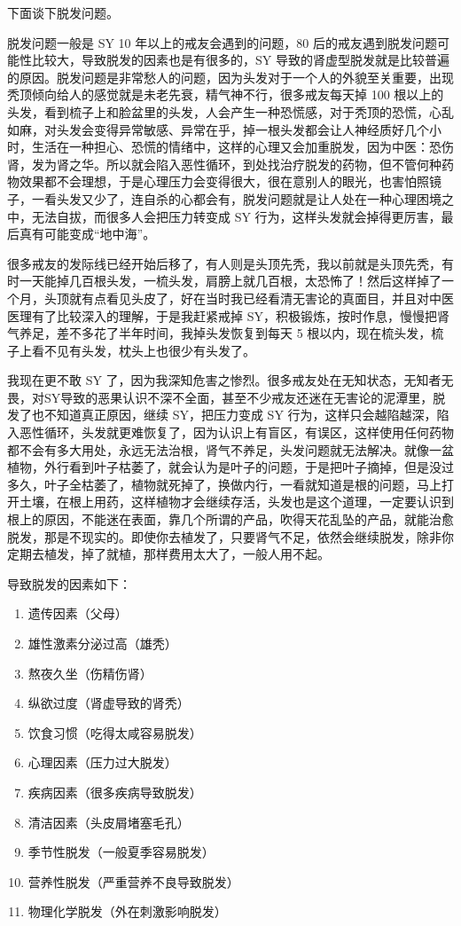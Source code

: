 \documentclass[fontset=founder]{ctexart}
\begin{document}
下面谈下脱发问题。

脱发问题一般是 SY 10 年以上的戒友会遇到的问题，80 后的戒友遇到脱发问题可能性比较大，导致脱发的因素也是有很多的，SY 导致的肾虚型脱发就是比较普遍的原因。脱发问题是非常愁人的问题，因为头发对于一个人的外貌至关重要，出现秃顶倾向给人的感觉就是未老先衰，精气神不行，很多戒友每天掉 100 根以上的头发，看到梳子上和脸盆里的头发，人会产生一种恐慌感，对于秃顶的恐慌，心乱如麻，对头发会变得异常敏感、异常在乎，掉一根头发都会让人神经质好几个小时，生活在一种担心、恐慌的情绪中，这样的心理又会加重脱发，因为中医：恐伤肾，发为肾之华。所以就会陷入恶性循环，到处找治疗脱发的药物，但不管何种药物效果都不会理想，于是心理压力会变得很大，很在意别人的眼光，也害怕照镜子，一看头发又少了，连自杀的心都会有，脱发问题就是让人处在一种心理困境之中，无法自拔，而很多人会把压力转变成 SY 行为，这样头发就会掉得更厉害，最后真有可能变成“地中海”。

很多戒友的发际线已经开始后移了，有人则是头顶先秃，我以前就是头顶先秃，有时一天能掉几百根头发，一梳头发，肩膀上就几百根，太恐怖了！然后这样掉了一个月，头顶就有点看见头皮了，好在当时我已经看清无害论的真面目，并且对中医医理有了比较深入的理解，于是我赶紧戒掉 SY，积极锻炼，按时作息，慢慢把肾气养足，差不多花了半年时间，我掉头发恢复到每天 5 根以内，现在梳头发，梳子上看不见有头发，枕头上也很少有头发了。

我现在更不敢 SY 了，因为我深知危害之惨烈。很多戒友处在无知状态，无知者无畏，对SY导致的恶果认识不深不全面，甚至不少戒友还迷在无害论的泥潭里，脱发了也不知道真正原因，继续 SY，把压力变成 SY 行为，这样只会越陷越深，陷入恶性循环，头发就更难恢复了，因为认识上有盲区，有误区，这样使用任何药物都不会有多大用处，永远无法治根，肾气不养足，头发问题就无法解决。就像一盆植物，外行看到叶子枯萎了，就会认为是叶子的问题，于是把叶子摘掉，但是没过多久，叶子全枯萎了，植物就死掉了，换做内行，一看就知道是根的问题，马上打开土壤，在根上用药，这样植物才会继续存活，头发也是这个道理，一定要认识到根上的原因，不能迷在表面，靠几个所谓的产品，吹得天花乱坠的产品，就能治愈脱发，那是不现实的。即使你去植发了，只要肾气不足，依然会继续脱发，除非你定期去植发，掉了就植，那样费用太大了，一般人用不起。


导致脱发的因素如下：

\begin{enumerate}
    \item 遗传因素（父母）
    \item 雄性激素分泌过高（雄秃）
    \item 熬夜久坐（伤精伤肾）
    \item 纵欲过度（肾虚导致的肾秃）
    \item 饮食习惯（吃得太咸容易脱发）
    \item 心理因素（压力过大脱发）
    \item 疾病因素（很多疾病导致脱发）
    \item 清洁因素（头皮屑堵塞毛孔）
    \item 季节性脱发（一般夏季容易脱发）
    \item 营养性脱发（严重营养不良导致脱发）
    \item 物理化学脱发（外在刺激影响脱发）
\end{enumerate}
\end{document}
